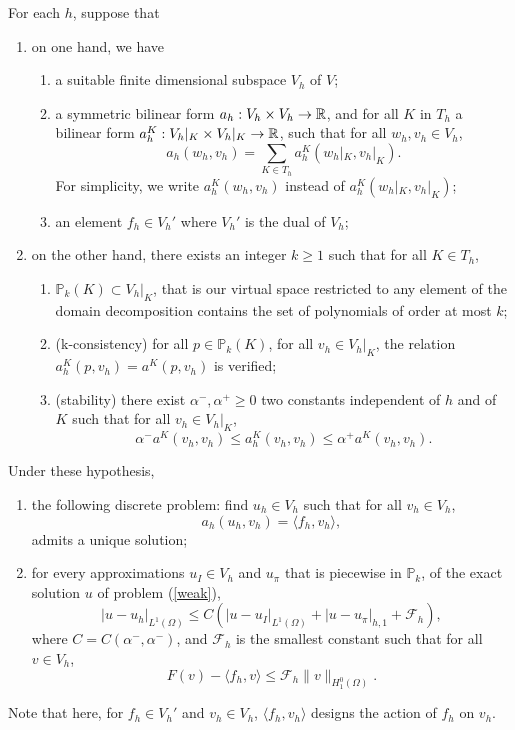 \begin{theorem}
For each $h$, suppose that
\begin{enumerate}
\item on one hand, we have \begin{enumerate}
\item a suitable finite dimensional subspace $V_h$ of $V$;
\item a symmetric bilinear form $a_h : V_h\times V_h \rightarrow \mathbb{R}$, and for all $K$ in $T_h$ a bilinear form $a_h^K:V_h|_K \times V_h|_K \rightarrow \mathbb{R}$, such that for all $w_h,v_h\in V_h$, 
$$ a_h(w_h, v_h) = \sum_{K\in T_h} a_h^K(w_h|_K,v_h|_K).$$ For simplicity, we write $a_h^K(w_h,v_h)$ instead of $a_h^K(w_h|_K,v_h|_K)$;
\item an element $f_h \in V_h'$ where $V_h'$ is the dual of $V_h$;
\end{enumerate}
\item on the other hand, there exists an integer $k\geq 1$ such that for all $K \in T_h$,
\begin{enumerate}
\item $\mathbb{P}_k(K) \subset V_h|_K$, that is our virtual space restricted to any element of the domain decomposition contains the set of polynomials of order at most $k$;
\item(k-consistency) for all $p\in \mathbb{P}_k(K)$, for all $v_h\in V_h|_K$, the relation $a_h^K(p, v_h) = a^K(p, v_h)$ is verified;
\item (stability) there exist $\alpha^-, \alpha^+ \geq 0$ two constants independent of $h$ and of $K$ such that for all $v_h\in V_h|_K$,
$$ \alpha^-a^K(v_h,v_h)\leq a_h^K(v_h,v_h)\leq \alpha^+a^K(v_h,v_h).$$
\end{enumerate}
\end{enumerate}
Under these hypothesis, 
\begin{enumerate}
\item the following discrete problem: find $u_h\in V_h$ such that for all $v_h \in V_h$, \begin{equation}\label{discretepb}
a_h(u_h,v_h) = \langle f_h,v_h\rangle,
\end{equation} admits a unique solution;
\item for every approximations $u_I\in V_h$ and $u_\pi$ that is piecewise in $\mathbb{P}_k$, of the exact solution $u$ of problem (\ref{weak}), $$|u-u_h|_{L^1(\Omega)} \leq C\left(|u-u_I|_{L^1(\Omega)} + |u-u_\pi|_{h,1} + \mathcal{F}_h\right),$$
where $C=C(\alpha^-,\alpha^-)$, and $\mathcal{F}_h$ is the smallest constant such that for all $v\in V_h$, $$F(v)-\langle f_h,v\rangle \leq \mathcal{F}_h\|v\|_{H^0_1(\Omega)}.$$ 
\end{enumerate}
\end{theorem}
\begin{notation}
Note that here, for $f_h\in V_h'$ and $v_h \in V_h$, $\langle f_h,v_h\rangle$ designs the action of $f_h$ on $v_h$.
\end{notation}

